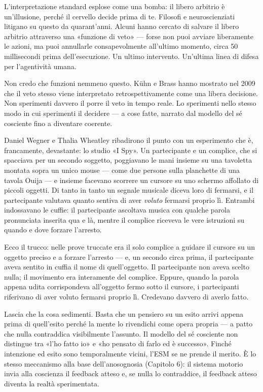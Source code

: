 \documentclass[11pt, twoside, openright]{book}
\begin{document}
L'interpretazione standard esplose come una bomba: il libero arbitrio è un'illusione, perché il cervello decide prima di te. Filosofi e neuroscienziati litigano su questo da quarant'anni. Alcuni hanno cercato di salvare il libero arbitrio attraverso una «funzione di veto» --- forse non puoi avviare liberamente le azioni, ma puoi annullarle consapevolmente all'ultimo momento, circa 50 millisecondi prima dell'esecuzione. Un ultimo intervento. Un'ultima linea di difesa per l'agentività umana.

Non credo che funzioni nemmeno questo. Kühn e Brass hanno mostrato nel 2009 che il veto stesso viene interpretato retrospettivamente come una libera decisione. Non sperimenti davvero il porre il veto in tempo reale. Lo sperimenti nello stesso modo in cui sperimenti il decidere --- a cose fatte, narrato dal modello del sé cosciente fino a diventare coerente.

Daniel Wegner e Thalia Wheatley ribadirono il punto con un esperimento che è, francamente, devastante: lo studio «I Spy». Un partecipante e un complice, che si spacciava per un secondo soggetto, poggiavano le mani insieme su una tavoletta montata sopra un unico mouse --- come due persone sulla planchette di una tavola Ouija --- e insieme facevano scorrere un cursore su uno schermo affollato di piccoli oggetti. Di tanto in tanto un segnale musicale diceva loro di fermarsi, e il partecipante valutava quanto sentiva di aver \textit{voluto} fermarsi proprio lì. Entrambi indossavano le cuffie: il partecipante ascoltava musica con qualche parola pronunciata inserita qua e là, mentre il complice riceveva le vere istruzioni su quando e dove forzare l'arresto.

Ecco il trucco: nelle prove truccate era il solo complice a guidare il cursore su un oggetto preciso e a forzare l'arresto --- e, un secondo circa prima, il partecipante aveva sentito in cuffia il nome di quell'oggetto. Il partecipante non aveva scelto nulla; il movimento era interamente del complice. Eppure, quando la parola appena udita corrispondeva all'oggetto fermo sotto il cursore, i partecipanti riferivano di aver voluto fermarsi proprio lì. Credevano davvero di averlo fatto.

Lascia che la cosa sedimenti. Basta che un pensiero su un esito arrivi appena prima di quell'esito perché la mente lo rivendichi come opera propria --- a patto che nulla contraddica visibilmente l'assunto. Il modello del sé cosciente non distingue tra «l'ho fatto io» e «ho pensato di farlo ed è successo». Finché intenzione ed esito sono temporalmente vicini, l'ESM se ne prende il merito. È lo stesso meccanismo alla base dell'anosognosia (Capitolo 6): il sistema motorio invia alla coscienza il feedback atteso e, se nulla lo contraddice, il feedback atteso diventa la realtà sperimentata.
\end{document}
